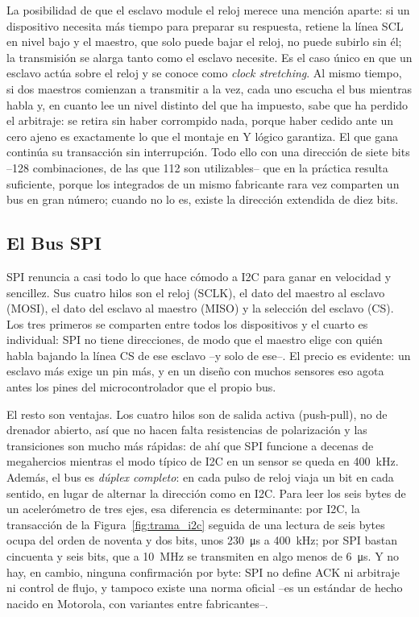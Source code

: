 La posibilidad de que el esclavo module el reloj merece una mención aparte: si un dispositivo necesita más tiempo para preparar su respuesta, retiene la línea SCL en nivel bajo y el maestro, que solo puede bajar el reloj, no puede subirlo sin él; la transmisión se alarga tanto como el esclavo necesite. Es el caso único en que un esclavo actúa sobre el reloj y se conoce como \emph{clock stretching}. Al mismo tiempo, si dos maestros comienzan a transmitir a la vez, cada uno escucha el bus mientras habla y, en cuanto lee un nivel distinto del que ha impuesto, sabe que ha perdido el arbitraje: se retira sin haber corrompido nada, porque haber cedido ante un cero ajeno es exactamente lo que el montaje en Y lógico garantiza. El que gana continúa su transacción sin interrupción. Todo ello con una dirección de siete bits --128 combinaciones, de las que 112 son utilizables-- que en la práctica resulta suficiente, porque los integrados de un mismo fabricante rara vez comparten un bus en gran número; cuando no lo es, existe la dirección extendida de diez bits.

\subsection{El Bus SPI}\label{sub:spi}

SPI renuncia a casi todo lo que hace cómodo a I2C para ganar en velocidad y sencillez. Sus cuatro hilos son el reloj (SCLK), el dato del maestro al esclavo (MOSI), el dato del esclavo al maestro (MISO) y la selección del esclavo (CS). Los tres primeros se comparten entre todos los dispositivos y el cuarto es individual: SPI no tiene direcciones, de modo que el maestro elige con quién habla bajando la línea CS de ese esclavo --y solo de ese--. El precio es evidente: un esclavo más exige un pin más, y en un diseño con muchos sensores eso agota antes los pines del microcontrolador que el propio bus.

El resto son ventajas. Los cuatro hilos son de salida activa (push-pull), no de drenador abierto, así que no hacen falta resistencias de polarización y las transiciones son mucho más rápidas: de ahí que SPI funcione a decenas de megahercios mientras el modo típico de I2C en un sensor se queda en \SI{400}{\kilo\hertz}. Además, el bus es \emph{dúplex completo}: en cada pulso de reloj viaja un bit en cada sentido, en lugar de alternar la dirección como en I2C. Para leer los seis bytes de un acelerómetro de tres ejes, esa diferencia es determinante: por I2C, la transacción de la Figura~\ref{fig:trama_i2c} seguida de una lectura de seis bytes ocupa del orden de noventa y dos bits, unos \SI{230}{\micro\second} a \SI{400}{\kilo\hertz}; por SPI bastan cincuenta y seis bits, que a \SI{10}{\mega\hertz} se transmiten en algo menos de \SI{6}{\micro\second}. Y no hay, en cambio, ninguna confirmación por byte: SPI no define ACK ni arbitraje ni control de flujo, y tampoco existe una norma oficial --es un estándar de hecho nacido en Motorola, con variantes entre fabricantes--.

